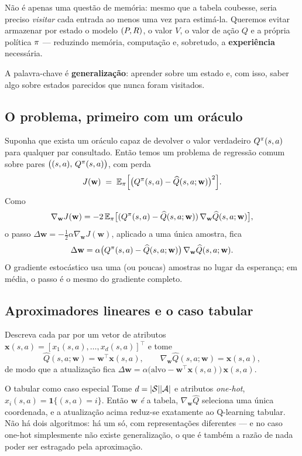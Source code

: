 \documentclass[11pt]{article}
\newcommand{\Qhat}{\widehat{Q}}
\newcommand{\wv}{\mathbf{w}}
\newcommand{\xv}{\mathbf{x}}
\begin{document}
Não é apenas uma questão de memória: mesmo que a tabela coubesse, seria preciso
\emph{visitar} cada entrada ao menos uma vez para estimá-la. Queremos evitar
armazenar por estado o modelo $(P,R)$, o valor $V$, o valor de ação $Q$ e a
própria política $\pi$ --- reduzindo memória, computação e, sobretudo, a
\textbf{experiência} necessária.

\begin{ideiabox}
  A palavra-chave é \textbf{generalização}: aprender sobre um estado e, com
  isso, saber algo sobre estados parecidos que nunca foram visitados.
\end{ideiabox}

\subsection{O problema, primeiro com um oráculo}

Suponha que exista um oráculo capaz de devolver o valor verdadeiro
$Q^{\pi}(s,a)$ para qualquer par consultado. Então temos um problema de
regressão comum sobre pares $\bigl((s,a),\, Q^{\pi}(s,a)\bigr)$, com perda
\[ J(\wv) \;=\; \E_{\pol}\Bigl[\bigl(Q^{\pol}(s,a) - \Qhat(s,a;\wv)\bigr)^2\Bigr]. \]
Como
\[ \nabla_{\wv} J(\wv) = -2\,\E_{\pol}\bigl[(Q^{\pol}(s,a) - \Qhat(s,a;\wv))\,\nabla_{\wv}\Qhat(s,a;\wv)\bigr], \]
o passo $\Delta \wv = -\tfrac{1}{2}\alpha \nabla_{\wv} J(\wv)$, aplicado a uma
única amostra, fica
\[ \Delta \wv = \alpha\bigl(Q^{\pol}(s,a) - \Qhat(s,a;\wv)\bigr)\,\nabla_{\wv}\Qhat(s,a;\wv). \]
O gradiente estocástico usa uma (ou poucas) amostras no lugar da esperança; em
média, o passo é o mesmo do gradiente completo.

\subsection{Aproximadores lineares e o caso tabular}

Descreva cada par por um vetor de atributos
$\xv(s,a) = [x_1(s,a), \dots, x_d(s,a)]^{\top}$ e tome
\[ \Qhat(s,a;\wv) = \wv^{\top}\xv(s,a), \qquad \nabla_{\wv}\Qhat(s,a;\wv) = \xv(s,a), \]
de modo que a atualização fica
$\Delta\wv = \alpha\bigl(\text{alvo} - \wv^{\top}\xv(s,a)\bigr)\,\xv(s,a)$.

\begin{defbox}{O tabular como caso especial}
  Tome $d = \lvert\mathcal{S}\rvert\lvert\mathcal{A}\rvert$ e atributos \emph{one-hot},
  $x_i(s,a) = \mathbf{1}\{(s,a) = i\}$. Então $\wv$ \emph{é} a tabela,
  $\nabla_{\wv}\Qhat$ seleciona uma única coordenada, e a atualização acima
  reduz-se exatamente ao Q-learning tabular. Não há dois algoritmos: há um só,
  com representações diferentes --- e no caso one-hot simplesmente não existe
  generalização, o que é também a razão de nada poder ser estragado pela
  aproximação.
\end{defbox}
\end{document}
